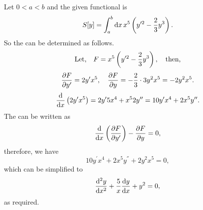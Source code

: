 \def\yp2{y^{\prime2}}%
\def\2o3{\frac{2}{3}}%
\def\func{x^5 \lr{\yp2 - \2o3y^3}}
Let $0 < a < b$ and the given functional is
\[
	S[y] = \Int{a}{b}{x} \func.
\]
So the \el can be determined as follows.
\[
	\textrm{Let,}\quad F = \func, \quad\textrm{then,}
\]
\[
	\pderiv{F}{y^\prime} = 2y^\prime x^5,\quad \pderiv{F}{y} = -\2o3\cdot3y^2x^5 = -2y^2x^5.
\]
\[
	\deriv{}{x}\lr{2y^\prime x^5} = 2y^\prime5x^4 + x^52y^\dprime = 10y^\prime x^4 + 2x^5y^\dprime.
\]
The \el can be written as
\[
	\ELE{F}{x}{y},
\]
therefore, we have
\[
	10y^\prime x^4 + 2x^5y^\dprime + 2y^2x^5 = 0,
\]
which can be simplified to
\[
	\deriv{^2y}{x^2} + \frac{5}{x}\deriv{y}{x} + y^2 = 0,
\]
as required.